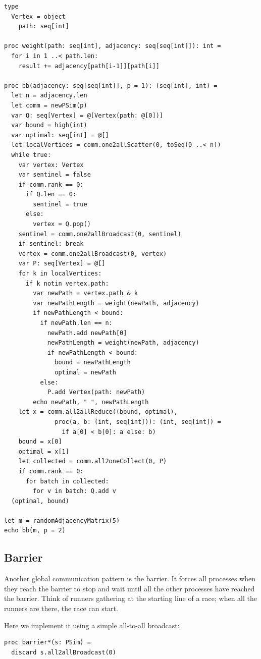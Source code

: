 \documentclass[justified, sixbynine]{tufte-book}
\def\ft{\small\tt}
\theoremstyle{plain}%
\newtheorem * {corollary}{Corollary}
\theoremstyle{definition}
\theoremstyle{remark}
\newtheorem * {remark}{Remark}
\newtheorem * {note}{Note}
\begin{document}
\begin{fullwidth}
\begin{lstlisting}[caption={in file: {\ft psim\_prim.nim}}]
type
  Vertex = object
    path: seq[int]

proc weight(path: seq[int], adjacency: seq[seq[int]]): int =
  for i in 1 ..< path.len:
    result += adjacency[path[i-1]][path[i]]

proc bb(adjacency: seq[seq[int]], p = 1): (seq[int], int) =
  let n = adjacency.len
  let comm = newPSim(p)
  var Q: seq[Vertex] = @[Vertex(path: @[0])]
  var bound = high(int)
  var optimal: seq[int] = @[]
  let localVertices = comm.one2allScatter(0, toSeq(0 ..< n))
  while true:
    var vertex: Vertex
    var sentinel = false
    if comm.rank == 0:
      if Q.len == 0:
        sentinel = true
      else:
        vertex = Q.pop()
    sentinel = comm.one2allBroadcast(0, sentinel)
    if sentinel: break
    vertex = comm.one2allBroadcast(0, vertex)
    var P: seq[Vertex] = @[]
    for k in localVertices:
      if k notin vertex.path:
        var newPath = vertex.path & k
        var newPathLength = weight(newPath, adjacency)
        if newPathLength < bound:
          if newPath.len == n:
            newPath.add newPath[0]
            newPathLength = weight(newPath, adjacency)
            if newPathLength < bound:
              bound = newPathLength
              optimal = newPath
          else:
            P.add Vertex(path: newPath)
        echo newPath, " ", newPathLength
    let x = comm.all2allReduce((bound, optimal),
              proc(a, b: (int, seq[int])): (int, seq[int]) =
                if a[0] < b[0]: a else: b)
    bound = x[0]
    optimal = x[1]
    let collected = comm.all2oneCollect(0, P)
    if comm.rank == 0:
      for batch in collected:
        for v in batch: Q.add v
  (optimal, bound)

let m = randomAdjacencyMatrix(5)
echo bb(m, p = 2)
\end{lstlisting}

\goodbreak\subsection{Barrier}

Another global communication pattern is the barrier. It forces all processes when they reach the barrier to stop and wait until all the other processes have reached the barrier. Think of runners gathering at the  starting line  of a race; when  all the runners are there, the race can start.

Here we implement it using a simple all-to-all broadcast:

\begin{lstlisting}[caption={in file: {\ft psim.nim}}]
proc barrier*(s: PSim) =
  discard s.all2allBroadcast(0)
\end{lstlisting}


\end{fullwidth}
\end{document}
